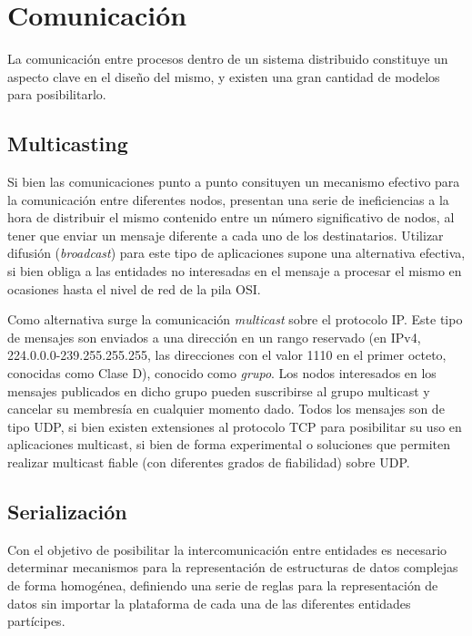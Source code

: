 \section{Comunicación}

La comunicación entre procesos dentro de un sistema distribuido constituye un aspecto clave en el diseño del mismo, y existen una gran cantidad de modelos para posibilitarlo.

\subsection{Multicasting}

Si bien las comunicaciones punto a punto consituyen un mecanismo efectivo para la comunicación entre diferentes nodos, presentan una serie de ineficiencias a la hora de distribuir el mismo contenido entre un número significativo de nodos, al tener que enviar un mensaje diferente a cada uno de los destinatarios. Utilizar difusión (\textit{broadcast}) para este tipo de aplicaciones supone una alternativa efectiva, si bien obliga a las entidades no interesadas en el mensaje a procesar el mismo en ocasiones hasta el nivel de red de la pila OSI.

Como alternativa surge la comunicación \textit{multicast} sobre el protocolo IP. Este tipo de mensajes son enviados a una dirección en un rango reservado (en IPv4, 224.0.0.0-239.255.255.255, las direcciones con el valor 1110 en el primer octeto, conocidas como Clase D\cite{rfc791}), conocido como \textit{grupo}. Los nodos interesados en los mensajes publicados en dicho grupo pueden suscribirse al grupo multicast y cancelar su membresía en cualquier momento dado. Todos los mensajes son de tipo UDP, si bien existen extensiones al protocolo TCP para posibilitar su uso en aplicaciones multicast, si bien de forma experimental\cite{1019386, mysore2001ftp, Barcellos01efficienttcp-like, Visoottiviseth01m/tcp:the, talpadereliablemulticast} o soluciones que permiten realizar multicast fiable (con diferentes grados de fiabilidad) sobre UDP\cite{rfc2887}.

\subsection{Serialización}
\label{seralization}
Con el objetivo de posibilitar la intercomunicación entre entidades es necesario determinar mecanismos para la representación de estructuras de datos complejas de forma homogénea, definiendo una serie de reglas para la representación de datos sin importar la plataforma de cada una de las diferentes entidades partícipes.

